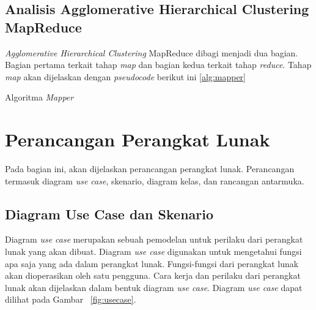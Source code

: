 \subsection{Analisis Agglomerative Hierarchical Clustering MapReduce}

\textit{Agglomerative Hierarchical Clustering} MapReduce dibagi menjadi dua bagian. Bagian pertama terkait tahap \textit{map} dan bagian kedua terkait tahap \textit{reduce}. Tahap \textit{map} akan dijelaskan dengan \textit{pseudocode} berikut ini \ref{alg:mapper}  

\begin{algorithm}[H]
	\DontPrintSemicolon\SetAlgoNoLine\LinesNumbered
	\BlankLine
	
	
	\caption{Algoritma \textit{Mapper}}
	\label{alg:mapper}
\end{algorithm}


\section{Perancangan Perangkat Lunak}

Pada bagian ini, akan dijelaskan perancangan perangkat lunak.  Perancangan termasuk diagram \textit{use case}, skenario, diagram kelas, dan rancangan antarmuka. 

\subsection{Diagram Use Case dan Skenario}

Diagram \textit{use case} merupakan sebuah pemodelan untuk perilaku dari perangkat lunak yang akan dibuat. Diagram \textit{use case} digunakan untuk mengetahui fungsi apa saja yang ada dalam perangkat lunak. Fungsi-fungsi dari perangkat lunak akan dioperasikan oleh satu pengguna. Cara kerja dan perilaku dari perangkat lunak akan dijelaskan dalam bentuk diagram \textit{use case}. Diagram \textit{use case} dapat dilihat pada Gambar ~\ref{fig:usecase}.

